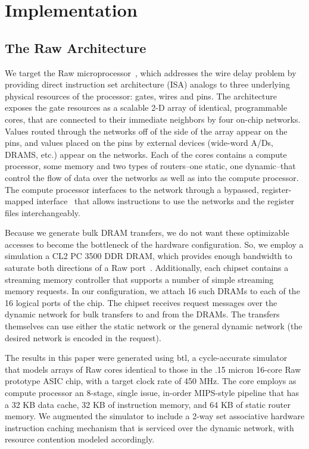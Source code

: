 \section{Implementation} 

\subsection{The Raw Architecture}
\label{sec:raw}

We target the Raw microprocessor~\cite{raw10,raw}, which addresses the
wire delay problem by providing direct instruction set
architecture (ISA) analogs to three underlying physical resources of
the processor: gates, wires and pins. The architecture exposes the
gate resources as a scalable 2-D array of identical, programmable
cores, that are connected to their immediate neighbors by four on-chip
networks.  Values routed through the networks off of the side of the
array appear on the pins, and values placed on the pins by external
devices (wide-word A/Ds, DRAMS, etc.) appear on the networks.  Each of
the cores contains a compute processor, some memory and two types of
routers--one static, one dynamic--that control the flow of data over
the networks as well as into the compute processor.  The compute
processor interfaces to the network through a bypassed,
register-mapped interface~\cite{raw10} that allows instructions to use
the networks and the register files interchangeably.

Because we generate bulk DRAM transfers, we do not want these
optimizable accesses to become the bottleneck of the hardware
configuration.  So, we employ a simulation a CL2 PC 3500 DDR DRAM,
which provides enough bandwidth to saturate both directions of a Raw
port~\cite{raw_isca}.  Additionally, each chipset contains a streaming
memory controller that supports a number of simple streaming memory
requests. In our configuration, we attach 16 such DRAMs to each of the
16 logical ports of the chip.  The chipset receives request messages
over the dynamic network for bulk transfers to and from the DRAMs.
The transfers themselves can use either the static network or the
general dynamic network (the desired network is encoded in the
request).

The results in this paper were generated using btl, a cycle-accurate
simulator that models arrays of Raw cores identical to those in the
.15 micron 16-core Raw prototype ASIC chip, with a target clock rate
of 450 MHz. The core employs as compute processor an 8-stage, single
issue, in-order MIPS-style pipeline that has a 32 KB data cache, 32 KB
of instruction memory, and 64 KB of static router memory.  We
augmented the simulator to include a 2-way set associative hardware
instruction caching mechanism that is serviced over the dynamic
network, with resource contention modeled accordingly. 

